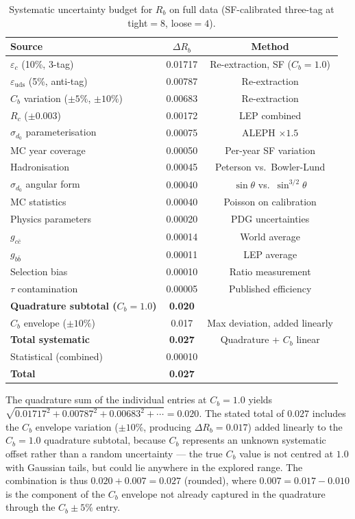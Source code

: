 \documentclass[11pt,a4paper]{article}
\begin{document}
\begin{table}[htbp]
\centering
\caption{Systematic uncertainty budget for $R_b$ on full data
(SF-calibrated three-tag at tight$=8$, loose$=4$).}
\label{tbl:rb_syst_fulldata}
\begin{tabular}{lcc}
\toprule
Source & $\Delta R_b$ & Method \\
\midrule
$\varepsilon_c$ (10\%, 3-tag) & 0.01717 & Re-extraction, SF ($C_b=1.0$) \\
$\varepsilon_\text{uds}$ (5\%, anti-tag) & 0.00787 & Re-extraction \\
$C_b$ variation ($\pm 5\%$, $\pm 10\%$) & 0.00683 & Re-extraction \\
$R_c$ ($\pm 0.003$) & 0.00172 & LEP combined \\
$\sigma_{d_0}$ parameterisation & 0.00075 & ALEPH $\times 1.5$ \\
MC year coverage & 0.00050 & Per-year SF variation \\
Hadronisation & 0.00045 & Peterson vs.\ Bowler-Lund \\
$\sigma_{d_0}$ angular form & 0.00040 & $\sin\theta$ vs.\ $\sin^{3/2}\theta$ \\
MC statistics & 0.00040 & Poisson on calibration \\
Physics parameters & 0.00020 & PDG uncertainties \\
$g_{c\bar{c}}$ & 0.00014 & World average \\
$g_{b\bar{b}}$ & 0.00011 & LEP average \\
Selection bias & 0.00010 & Ratio measurement \\
$\tau$ contamination & 0.00005 & Published efficiency \\
\midrule
\textbf{Quadrature subtotal ($C_b = 1.0$)} & \textbf{0.020} & \\
$C_b$ envelope ($\pm 10\%$) & 0.017 & Max deviation, added linearly \\
\midrule
\textbf{Total systematic} & \textbf{0.027} & Quadrature + $C_b$ linear \\
Statistical (combined) & 0.00010 & \\
\textbf{Total} & \textbf{0.027} & \\
\bottomrule
\end{tabular}
\end{table}

The quadrature sum of the individual entries at $C_b = 1.0$ yields
$\sqrt{0.01717^2 + 0.00787^2 + 0.00683^2 + \cdots} = 0.020$.
The stated total of $0.027$ includes the $C_b$ envelope variation
($\pm 10\%$, producing $\Delta R_b = 0.017$) added linearly to the
$C_b = 1.0$ quadrature subtotal, because $C_b$ represents an unknown
systematic offset rather than a random uncertainty --- the true
$C_b$ value is not centred at $1.0$ with Gaussian tails, but could
lie anywhere in the explored range.
The combination is thus $0.020 + 0.007 = 0.027$ (rounded), where
$0.007 = 0.017 - 0.010$ is the component of the $C_b$ envelope not
already captured in the quadrature through the $C_b \pm 5\%$ entry.
\end{document}
